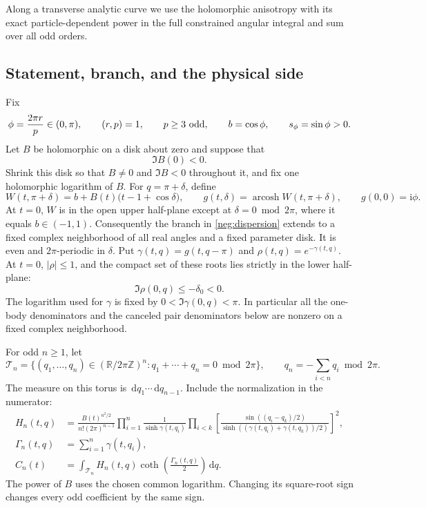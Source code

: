 \documentclass[11pt]{article}
\numberwithin{equation}{section}
\theoremstyle{definition}
\newcommand{\R}{\mathbb R}
\newcommand{\Z}{\mathbb Z}
\newcommand{\ii}{\mathrm i}
\newcommand{\dd}{\,\mathrm d}
\begin{document}
Along a transverse analytic curve we use the holomorphic anisotropy
with its exact particle-dependent power in the full constrained
angular integral and sum over all odd orders.

\subsection{Statement, branch, and the physical side}
\label{neg:setup}

Fix
\begin{equation}
 \phi=\frac{2\pi r}{p}\in(0,\pi),\qquad
 (r,p)=1,\qquad p\ge3\ \hbox{odd},\qquad
 b=\cos\phi,\qquad s_\phi=\sin\phi>0 .
 \label{neg:rational}
\end{equation}
Let \(B\) be holomorphic on a disk about zero and suppose that
\begin{equation}
 \Im B(0)<0 .
 \label{neg:orientation}
\end{equation}
Shrink this disk so that \(B\ne0\) and \(\Im B<0\) throughout it, and
fix one holomorphic logarithm of \(B\).  For \(q=\pi+\delta\), define
\begin{equation}
 W(t,\pi+\delta)
   =b+B(t)\bigl(t-1+\cos\delta\bigr),\qquad
 g(t,\delta)=\operatorname{arcosh}W(t,\pi+\delta),\qquad
 g(0,0)=\ii\phi .
 \label{neg:dispersion}
\end{equation}
At \(t=0\), \(W\) is in the open upper half-plane except at
\(\delta=0\bmod 2\pi\), where it equals \(b\in(-1,1)\).  Consequently
the branch in \eqref{neg:dispersion} extends to a fixed complex
neighborhood of all real angles and a fixed parameter disk.  It is
even and \(2\pi\)-periodic in \(\delta\).  Put
\(\gamma(t,q)=g(t,q-\pi)\) and \(\rho(t,q)=e^{-\gamma(t,q)}\).
At \(t=0\), \(|\rho|\le1\), and the compact set of these roots lies
strictly in the lower half-plane:
\begin{equation}
 \Im\rho(0,q)\le-\delta_0<0 .
 \label{neg:root-compact}
\end{equation}
The logarithm used for \(\gamma\) is fixed by
\(0<\Im\gamma(0,q)<\pi\).  In particular all the one-body
denominators and the canceled pair denominators below are nonzero on
a fixed complex neighborhood.

For odd \(n\ge1\), let
\[
 \mathcal T_n=\{(q_1,\ldots,q_n)\in(\R/2\pi\Z)^n:
                         q_1+\cdots+q_n=0\bmod 2\pi\},
 \qquad q_n=-\sum_{i<n}q_i\bmod 2\pi .
 \]
The measure on this torus is \(\dd q_1\cdots\dd q_{n-1}\).  Include
the normalization in the numerator:
\begin{align}
 H_n(t,q)
 &=\frac{B(t)^{n^2/2}}{n!(2\pi)^{n-1}}
   \prod_{i=1}^n\frac1{\sinh\gamma(t,q_i)}
   \prod_{i<k}
   \left[
    \frac{\sin((q_i-q_k)/2)}
         {\sinh((\gamma(t,q_i)+\gamma(t,q_k))/2)}
   \right]^2 ,
 \label{neg:numerator}\\
 \Gamma_n(t,q)&=\sum_{i=1}^n\gamma(t,q_i),\\
 C_n(t)&=\int_{\mathcal T_n}H_n(t,q)
                          \coth\!\left(\frac{\Gamma_n(t,q)}2\right)
                          \dd q .
 \label{neg:coefficient}
\end{align}
The power of \(B\) uses the chosen common logarithm.  Changing its
square-root sign changes every odd coefficient by the same sign.
\end{document}
